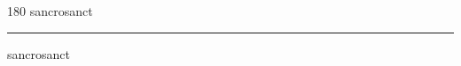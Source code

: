 
\begin{frame}
\begin{center}
\begin{turn}{180}
{\fontsize{2.5cm}{1em}\selectfont sancrosanct}
\end{turn}
\vspace{1em}\par  
\hrule
\vspace{1em}\par  
{\fontsize{2.5cm}{1em}\selectfont sancrosanct}
\end{center}
\end{frame}
